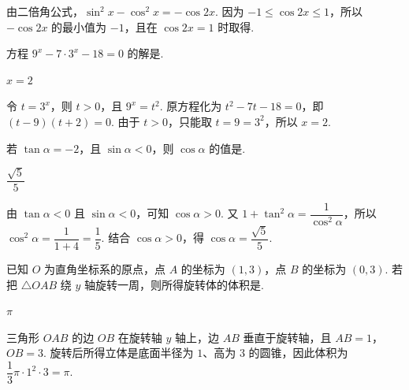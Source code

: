 \documentclass[UTF8,a4paper,oneside,11pt]{ctexbook}
\begin{document}
\begin{solution}
由二倍角公式，\(\sin^{2}x-\cos^{2}x=-\cos 2x\). 因为 \(-1\leqslant\cos 2x\leqslant1\)，所以 \(-\cos 2x\) 的最小值为 \(-1\)，且在 \(\cos 2x=1\) 时取得.
\end{solution}

\begin{problem}

方程 \(9^{x}-7\cdot3^{x}-18=0\) 的解是\fillinblank{}.

\begin{answer}
\(x=2\)
\end{answer}
\end{problem}

\begin{solution}
令 \(t=3^x\)，则 \(t>0\)，且 \(9^x=t^2\). 原方程化为 \(t^2-7t-18=0\)，即 \((t-9)(t+2)=0\). 由于 \(t>0\)，只能取 \(t=9=3^2\)，所以 \(x=2\).
\end{solution}

\begin{problem}

若 \(\tan\alpha=-2\)，且 \(\sin\alpha<0\)，则 \(\cos\alpha\) 的值是\fillinblank{}.

\begin{answer}
\(\dfrac{\sqrt{5}}{5}\)
\end{answer}
\end{problem}

\begin{solution}
由 \(\tan\alpha<0\) 且 \(\sin\alpha<0\)，可知 \(\cos\alpha>0\). 又
\(1+\tan^2\alpha=\dfrac{1}{\cos^2\alpha}\)，所以 \(\cos^2\alpha=\dfrac{1}{1+4}=\dfrac{1}{5}\). 结合 \(\cos\alpha>0\)，得 \(\cos\alpha=\dfrac{\sqrt{5}}{5}\).
\end{solution}

\begin{problem}

已知 \(O\) 为直角坐标系的原点，点 \(A\) 的坐标为 \((1,3)\)，点 \(B\) 的坐标为 \((0,3)\). 若把 \(\triangle OAB\) 绕 \(y\) 轴旋转一周，则所得旋转体的体积是\fillinblank{}.

\begin{answer}
\(\pi\)
\end{answer}
\end{problem}

\begin{solution}
三角形 \(OAB\) 的边 \(OB\) 在旋转轴 \(y\) 轴上，边 \(AB\) 垂直于旋转轴，且 \(AB=1\)，\(OB=3\). 旋转后所得立体是底面半径为 \(1\)、高为 \(3\) 的圆锥，因此体积为 \(\dfrac{1}{3}\pi\cdot1^2\cdot3=\pi\).
\end{solution}
\end{document}
